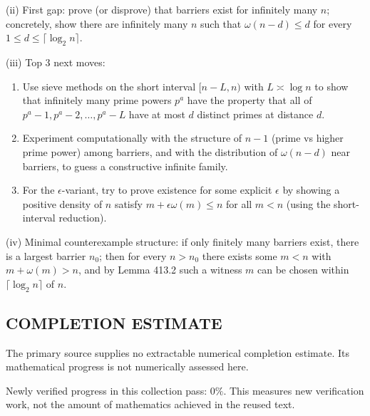 (ii) First gap: prove (or disprove) that barriers exist for infinitely many $n$; concretely, show there are infinitely many $n$ such that $\omega(n-d)\le d$ for every $1\le d\le \lceil \log_2 n\rceil$.

(iii) Top 3 next moves:
\begin{enumerate}
  \item Use sieve methods on the short interval $[n-L,n)$ with $L\asymp \log n$ to show that infinitely many prime powers $p^a$ have the property that all of $p^a-1,p^a-2,\dots,p^a-L$ have at most $d$ distinct primes at distance $d$.
  \item Experiment computationally with the structure of $n-1$ (prime vs higher prime power) among barriers, and with the distribution of $\omega(n-d)$ near barriers, to guess a constructive infinite family.
  \item For the $\epsilon$-variant, try to prove existence for some explicit $\epsilon$ by showing a positive density of $n$ satisfy $m+\epsilon\omega(m)\le n$ for all $m<n$ (using the short-interval reduction).
\end{enumerate}

(iv) Minimal counterexample structure: if only finitely many barriers exist, there is a largest barrier $n_0$; then for every $n>n_0$ there exists some $m<n$ with $m+\omega(m)>n$, and by Lemma 413.2 such a witness $m$ can be chosen within $\lceil \log_2 n\rceil$ of $n$.




\subsection*{COMPLETION ESTIMATE}
The primary source supplies no extractable numerical completion estimate. Its mathematical progress is not numerically assessed here.

Newly verified progress in this collection pass: $0\%$. This measures new verification work, not the amount of mathematics achieved in the reused text.
